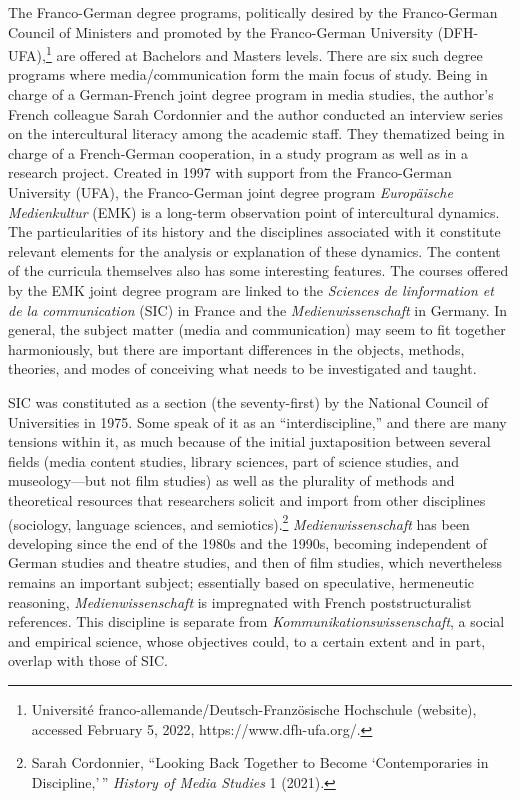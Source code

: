 \documentclass{tufte-handout}
\begin{document}
The Franco-German degree programs, politically desired by the
Franco-German Council of Ministers and promoted by the Franco-German
University (DFH-UFA),\footnote{Université
  franco-allemande/Deutsch-Französische Hochschule (website), accessed
  February 5, 2022, https://www.dfh-ufa.org/.} are offered at
Bachelor\textquotesingle s and Master\textquotesingle s levels. There
are six such degree programs where media/communication form the main
focus of study. Being in charge of a German-French joint degree program
in media studies, the author's French colleague Sarah Cordonnier and the
author conducted an interview series on the intercultural literacy among
the academic staff. They thematized being in charge of a French-German
cooperation, in a study program as well as in a research project.
Created in 1997 with support from the Franco-German University (UFA),
the Franco-German joint degree program \emph{Europäische Medienkultur}
(EMK) is a long-term observation point of intercultural dynamics. The
particularities of its history and the disciplines associated with it
constitute relevant elements for the analysis or explanation of these
dynamics. The content of the curricula themselves also has some
interesting features. The courses offered by the EMK joint degree
program are linked to the \emph{Sciences de
l\textquotesingle information et de la communication} (SIC) in France
and the \emph{Medienwissenschaft} in Germany. In general, the subject
matter (media and communication) may seem to fit together harmoniously,
but there are important differences in the objects, methods, theories,
and modes of conceiving what needs to be investigated and taught.

SIC was constituted as a section (the seventy-first) by the National
Council of Universities in 1975. Some speak of it as an
``interdiscipline,'' and there are many tensions within it, as much
because of the initial juxtaposition between several fields (media
content studies, library sciences, part of science studies, and
museology---but not film studies) as well as the plurality of methods
and theoretical resources that researchers solicit and import from other
disciplines (sociology, language sciences, and semiotics).\footnote{Sarah
  Cordonnier, ``Looking Back Together to Become `Contemporaries in
  Discipline,'\,'' \emph{History of Media Studies} 1 (2021).}
\emph{Medienwissenschaft} has been developing since the end of the 1980s
and the 1990s, becoming independent of German studies and theatre
studies, and then of film studies, which nevertheless remains an
important subject; essentially based on speculative, hermeneutic
reasoning, \emph{Medienwissenschaft} is impregnated with French
poststructuralist references. This discipline is separate from
\emph{Kommunikationswissenschaft}, a social and empirical science, whose
objectives could, to a certain extent and in part, overlap with those of
SIC.
\end{document}
